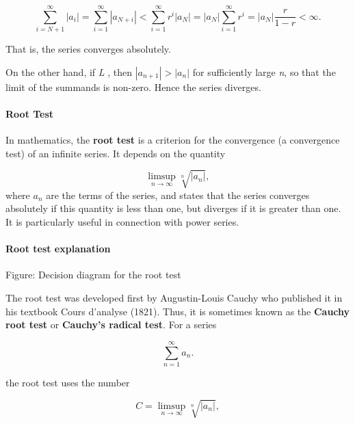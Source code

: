 $$\sum _{i=N+1}^{\infty}|a _i| = \sum _{i=1}^{\infty} \left |a _{N+i} \right | < \sum _{i=1}^{\infty}r^{i}|a _{N}| = |a _{N}| \sum _{i=1}^{\infty} r^{i} = |a _{N}|\frac{r}{1 - r} < \infty.$$



That is, the series converges absolutely.



On the other hand, if \textit{L} , then $|a _{n+1}| > |a _{n}|$ for sufficiently large \textit{n}, so that the limit of the summands is non-zero. Hence the series diverges.



\paragraph{Root Test}



In mathematics, the \textbf{root test} is a criterion for the convergence (a convergence test) of an infinite series. It depends on the quantity



$$\limsup _{n\rightarrow\infty}\sqrt[n]{|a _n|},$$ where $a _n$ are the terms of the series, and states that the series converges absolutely if this quantity is less than one, but diverges if it is greater than one. It is particularly useful in connection with power series.



\paragraph{Root test explanation}






Figure: Decision diagram for the root test



The root test was developed first by Augustin-Louis Cauchy who published it in his textbook Cours d'analyse (1821). Thus, it is sometimes known as the \textbf{Cauchy root test} or \textbf{Cauchy's radical test}. For a series



$$\sum _{n=1}^\infty a _n.$$



the root test uses the number



$$C = \limsup _{n\rightarrow\infty}\sqrt[n]{|a _n|},$$



